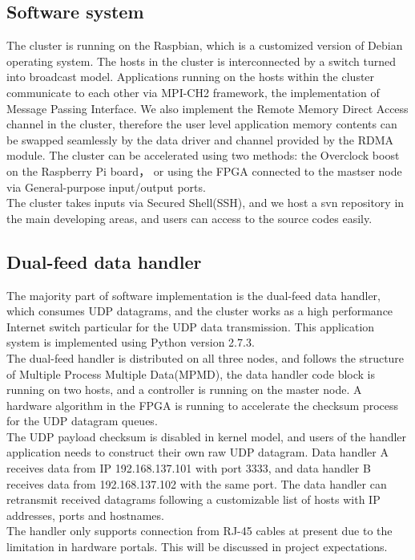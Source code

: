 \documentclass[11pt,openright,a4paper]{report}
\begin{document}
\subsection{Software system}
The cluster is running on the Raspbian, which is a customized version of Debian operating system. The hosts in the cluster is interconnected by a switch turned into broadcast model. Applications running on the hosts within the cluster communicate to each other via MPI-CH2 framework, the implementation of Message Passing Interface. We also implement the Remote Memory Direct Access channel in the cluster, therefore the user level application memory contents can be swapped seamlessly by the data driver and channel provided by the RDMA module. The cluster can be accelerated using two methods: the Overclock boost on the Raspberry Pi board\cite{upton2012meet}， or using the FPGA connected to the mastser node via General-purpose input/output ports. \\
The cluster takes inputs via Secured Shell(SSH), and we host a svn repository in the main developing areas, and users can access to the source codes easily.\\
\subsection{Dual-feed data handler}
The majority part of software implementation is the dual-feed data handler, which consumes UDP datagrams, and the cluster works as a high performance Internet switch particular for the UDP data transmission. This application system is implemented using Python version 2.7.3.\\
The dual-feed handler is distributed on all three nodes, and follows the structure of Multiple Process Multiple Data(MPMD), the data handler code block is  running on two hosts, and a controller is running on the master node. A hardware algorithm in the FPGA is running to accelerate the checksum process for the UDP datagram queues.\\
The UDP payload checksum is disabled in kernel model, and users of the handler application needs to construct their own raw UDP datagram. Data handler A receives data from IP 192.168.137.101 with port 3333, and data handler B receives data from 192.168.137.102 with the same port. The data handler can retransmit received datagrams following a customizable list of hosts with IP addresses, ports and hostnames.\\
The handler only supports connection from RJ-45 cables at present due to the limitation in hardware portals. This will be discussed in project expectations.\\
\end{document}
